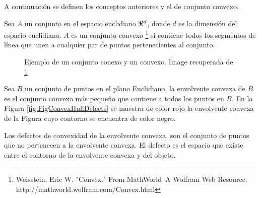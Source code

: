 A continuación se definen los conceptos anteriores y el de conjunto convexo.

Sea $A$ un conjunto en el espacio euclidiano $\bold{\Re}^d$, donde $d$ es la dimensión del espacio euclidiano. $A$ es un conjunto convexo \footnote{\label{ConvexFN} Weisstein, Eric W. "Convex." From MathWorld--A Wolfram Web Resource. http://mathworld.wolfram.com/Convex.html} si contiene todos los segmentos de línea que unen a cualquier par de puntos pertenecientes al conjunto.  
\begin{figure}[h!]
\centering
{} \hspace{10mm}
 \hspace{10mm}
\caption{Ejemplo de un conjunto conexo y un convexo. Image recuperada de \ref{ConvexFN} }\label{fig:Sets}
\end{figure} 

Sea $B$ un conjunto de puntos en el plano Euclidiano, la envolvente convexa de $B$ es el conjunto convexo más pequeño que contiene a todos los puntos en $B$. En la Figura \ref{fig:FigConvexHullDefects} se muestra de color rojo la envolvente convexa de la Figura cuyo contorno se encuentra de color negro. 

Los defectos de convexidad de la envolvente convexa, son el conjunto de puntos que no pertenecen a la envolvente convexa. El defecto es el espacio que existe entre el contorno de la envolvente convexa y del objeto.

